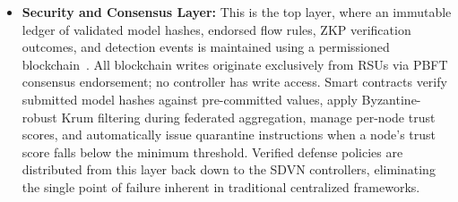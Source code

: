 \documentclass[12pt, a4paper]{report}
\begin{document}
\begin{itemize}
\item \textbf{Security and Consensus Layer:} This is the top layer, where an 
immutable ledger of validated model hashes, endorsed flow rules, ZKP verification 
outcomes, and detection events is maintained using a permissioned 
blockchain~\cite{DBLP:journals/air/QammarKND23, Zhai_2019}. All blockchain writes 
originate exclusively from RSUs via PBFT consensus endorsement; no controller 
has write access. Smart contracts verify submitted model hashes against 
pre-committed values, apply Byzantine-robust Krum filtering during federated 
aggregation, manage per-node trust scores, and automatically issue quarantine 
instructions when a node's trust score falls below the minimum threshold. Verified 
defense policies are distributed from this layer back down to the SDVN controllers, 
eliminating the single point of failure inherent in traditional centralized 
frameworks.

\end{itemize}
\end{document}
